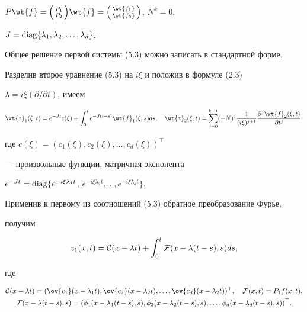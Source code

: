 $P\wt{f}=\Big( \begin{smallmatrix} P_1 \\ P_2 \end{smallmatrix} \Big)\wt {f}=


\left(\begin{smallmatrix} \wt{f_1} \\ \wt{f_2} \end{smallmatrix}


\right)$, $N^k=0$,


$J=\operatorname{diag} \{\lambda_1 , \lambda_2, \dotsc , \lambda_d \}$.





Общее решение первой системы (5.3) можно записать в стандартной форме.


Разделив второе уравнение (5.3) на $i\xi $ и положив в формуле (2.3)


$\lambda =i\xi(\partial/\partial t)$, имеем


$$


\wt{z}_1(\xi,t)=e^{-Jt}c(\xi)+


\int^t_0e^{-J(t-s)}\wt {f}_1(\xi,s)ds,\quad


\wt{z}_2(\xi,t)=\sum\limits_{j=0}^{k-1}(-N)^j


\frac {1}{(i\xi)^{j+1}}


\frac{\partial^j\wt{f}_2(\xi,t)}{\partial{t}^j},


$$


где $c(\xi)=(c_1(\xi), c_2(\xi),


\dotsc, c_d(\xi))^{\top}$


--- произвольные функции, матричная экспонента


$e^{-Jt}=\diag \{e^{-i\xi\lambda_1 t}$, $e^{-i\xi\lambda_2 t},




\dotsc,e^{-i\xi\lambda_d t}\}$.


Применив к первому из соотношений (5.3) обратное преобразование Фурье,


получим


\begin{equation}


z_1(x,t)={\cal C}(x-\lambda t)+


\int^t_0{\cal F}(x-\lambda (t-s),s)ds,


\end{equation}


где


\begin{gather*}


{\cal C}(x-\lambda t)=


(\ov{c_1}(x-\lambda_1 t), \ov{c_2}(x-\lambda_2 t),


\dotsc, \ov{c_d}(x-\lambda_2 t))^{\top },\quad {\cal F}(x,t)=P_1f(x,t),\\


%


{\cal F}(x-\lambda (t-s),s)=


(\phi _1(x-\lambda_1(t-s),s), \phi _2(x-\lambda_2(t-s),s),


\dotsc, \phi _d(x-\lambda_d(t-s),s))^{\top}.


\end{gather*}


